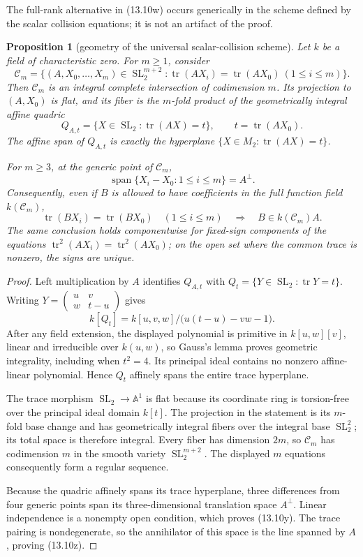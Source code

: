 \documentclass[11pt,reqno]{amsart}
\newtheorem{proposition}[theorem]{Proposition}
\theoremstyle{definition}
\theoremstyle{remark}
\newcommand{\Tr}{\operatorname{tr}}
\newcommand{\Span}{\operatorname{span}}
\newcommand{\SL}{\operatorname{SL}}
\begin{document}
The full-rank alternative in (13.10w) occurs generically in the scheme
defined by the scalar collision equations; it is not an artifact of the
proof.

\begin{proposition}[geometry of the universal scalar-collision scheme]
\label{prop:universal-collision-scheme}
Let \(k\) be a field of characteristic zero.  For \(m\ge1\), consider
\[
 \mathcal C_m=
 \{(A,X_0,\ldots,X_m)\in\SL_2^{m+2}:
   \Tr(AX_i)=\Tr(AX_0)\ (1\le i\le m)\}.
\]
Then \(\mathcal C_m\) is an integral complete intersection of codimension
\(m\).  Its projection to \((A,X_0)\) is flat, and its fiber is the
\(m\)-fold product of the geometrically integral affine quadric
\[
 Q_{A,t}=\{X\in\SL_2:\Tr(AX)=t\},
 \qquad t=\Tr(AX_0).
\]
The affine span of \(Q_{A,t}\) is exactly the hyperplane
\(\{X\in M_2:\Tr(AX)=t\}\).

For \(m\ge3\), at the generic point of \(\mathcal C_m\),
\[
 \Span\{X_i-X_0:1\le i\le m\}=A^\perp.
\tag{13.10y}
\]
Consequently, even if \(B\) is allowed to have coefficients in the full
function field \(k(\mathcal C_m)\),
\[
 \Tr(BX_i)=\Tr(BX_0)\quad(1\le i\le m)
 \quad\Longrightarrow\quad B\in k(\mathcal C_m)A.
\tag{13.10z}
\]
The same conclusion holds componentwise for fixed-sign components of the
equations \(\Tr^2(AX_i)=\Tr^2(AX_0)\); on the open set where the common
trace is nonzero, the signs are unique.
\end{proposition}

\begin{proof}
Left multiplication by \(A\) identifies \(Q_{A,t}\) with
\(Q_t=\{Y\in\SL_2:\Tr Y=t\}\).  Writing
\(Y=(\begin{smallmatrix}u&v\\w&t-u\end{smallmatrix})\) gives
\[
 k[Q_t]=k[u,v,w]/\bigl(u(t-u)-vw-1\bigr).
\]
After any field extension, the displayed polynomial is primitive in
\(k[u,w][v]\), linear and irreducible over \(k(u,w)\), so Gauss's lemma
proves geometric integrality, including when \(t^2=4\).  Its principal
ideal contains no nonzero affine-linear polynomial.  Hence \(Q_t\)
affinely spans the entire trace hyperplane.

The trace morphism \(\SL_2\to\mathbb A^1\) is flat because its coordinate
ring is torsion-free over the principal ideal domain \(k[t]\).  The
projection in the statement is its \(m\)-fold base change and has
geometrically integral fibers over the integral base \(\SL_2^2\); its
total space is therefore integral.  Every fiber has dimension \(2m\), so
\(\mathcal C_m\) has codimension \(m\) in the smooth variety
\(\SL_2^{m+2}\).  The displayed \(m\) equations consequently form a
regular sequence.

Because the quadric affinely spans its trace hyperplane, three differences
from four generic points span its three-dimensional translation space
\(A^\perp\).  Linear independence is a nonempty open condition, which
proves (13.10y).  The trace pairing is nondegenerate, so the annihilator of
this space is the line spanned by \(A\), proving (13.10z).
\end{proof}
\end{document}
